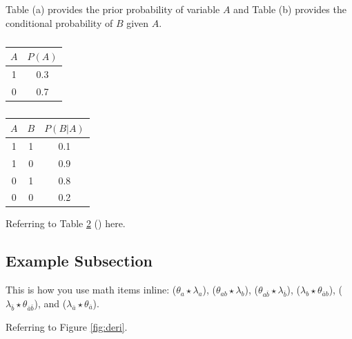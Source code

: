 \documentclass[twoside,11pt]{article}
\begin{document}
\begin{table}[!htb]

    \caption{Table (a) provides the prior probability of variable $A$ and Table (b) provides the conditional probability of $B$ given $A$.}
    \begin{subtable}{.5\linewidth}
      \centering
        \caption{}
        \begin{tabular}{c|c}
            $A$ & $P(A)$ \\ \hline
            1 & 0.3 \\
            0 & 0.7
        \end{tabular}
        \label{sub_table}
    \end{subtable}%
    \begin{subtable}{.5\linewidth}
      \centering
        \caption{}
        \begin{tabular}{cc|c}
            $A$ & $B$ & $P(B|A)$ \\ \hline
            1 & 1 & 0.1 \\
            1 & 0 & 0.9 \\
            0 & 1 & 0.8 \\
            0 & 0 & 0.2 \\
        \end{tabular}
    \end{subtable} 
        \label{subtb:pa}
\end{table}

Referring to Table \ref{subtb:pa} () here.

\subsection{Example Subsection}

This is how you use math items inline: 
($\theta_a \star \lambda_a$), 
($\theta_{ab} \star \lambda_{{b}}$), 
($\theta_{a{\bar b}} \star \lambda_{{\bar b}}$),
($\lambda_{{b}} \star \theta_{{\bar a}b}$),
($\lambda_{{\bar b}} \star \theta_{{\bar a}\bar{b}}$), and
($\lambda_{{\bar a}} \star \theta_{{\bar a}}$).


Referring to Figure \ref{fig:deri}. 



\newpage %
\end{document}
